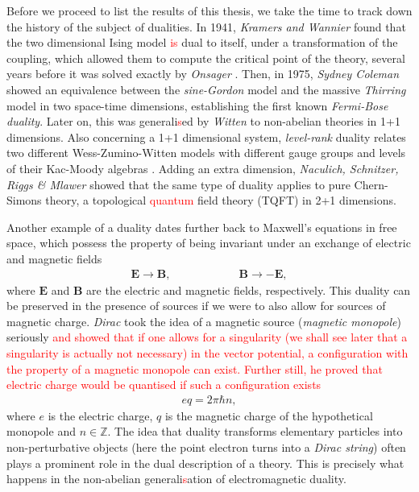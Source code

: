 Before we proceed to list the results of this thesis, we take the time to track down the history of the subject of dualities. In 1941, \textit{Kramers and Wannier} \cite{PhysRev.60.252} found that the two dimensional Ising model \textcolor{red}{is} dual to itself, under a transformation of the coupling, which allowed them to compute the critical point of the theory, several years before it was solved exactly by \textit{Onsager} \cite{PhysRev.65.117}.  Then, in 1975, \textit{Sydney Coleman} \cite{Coleman:1974bu} showed an equivalence between the \textit{sine-Gordon} model \cite{Scott1973} and the massive \textit{Thirring} model \cite{Thirring1958} in two space-time dimensions, establishing the first known \textit{Fermi-Bose duality}. Later on, this was generali\textcolor{red}{s}ed by \textit{Witten} \cite{Witten:1983ar} to non-abelian theories in 1+1 dimensions. Also concerning a 1+1 dimensional system, \textit{level-rank} duality relates two different Wess-Zumino-Witten models with different gauge groups and levels of their Kac-Moody algebras \cite{Nakanishi:1990hj, Naculich:1990hg}. Adding an extra dimension, \textit{Naculich, Schnitzer, Riggs \& Mlawer} \cite{Mlawer:1990uv, Naculich:2007nc} showed that the same type of duality applies to pure Chern-Simons theory, a topological \textcolor{red}{quantum} field theory (TQFT) in 2+1 dimensions. 

Another example of a duality dates further back to Maxwell's equations in free space, which possess the property of being invariant under an exchange of electric and magnetic fields
\begin{align}
\bm{E}\rightarrow \bm{B}, \qquad\qquad\qquad \bm{B}\rightarrow -\bm{E},
\end{align}
where $\bm{E}$ and $\bm{B}$ are the electric and magnetic fields, respectively. This duality can be preserved in the presence of sources if we were to also allow for sources of magnetic charge. \textit{Dirac} \cite{Dirac:1931kp} took the idea of a magnetic source (\textit{magnetic monopole}) seriously \textcolor{red}{and showed that if one allows for a singularity (we shall see later that a singularity is actually not necessary) in the vector potential, a configuration with the property of a magnetic monopole can exist. Further still, he proved that electric charge would be quanti\textcolor{red}{s}ed if such a configuration exists}
\begin{align}
eq = 2\pi \hbar n,
\end{align}
where $e$ is the electric charge, $q$ is the magnetic charge of the hypothetical monopole and $n \in \mathbb{Z}$. The idea that duality transforms elementary particles into non-perturbative objects (here the point electron turns into a \textit{Dirac string}) often plays a prominent role in the dual description of a theory. This is precisely what happens in the non-abelian generali\textcolor{red}{s}ation of electromagnetic duality.


